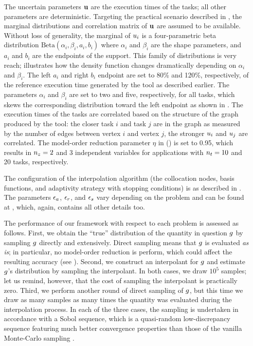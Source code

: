 
The uncertain parameters $\mathbf{u}$ are the execution times of the tasks; all other
parameters are deterministic. Targeting the practical scenario described in
, the marginal distributions and correlation matrix of $\mathbf{u}$
are assumed to be available. Without loss of generality, the marginal of $u_i$
is a four-parametric beta distribution $\text{Beta}(\alpha_i, \beta_i, a_i,
b_i)$ where $\alpha_i$ and $\beta_i$ are the shape parameters, and $a_i$ and
$b_i$ are the endpoints of the support. This family of distributions is very
reach;  illustrates how the density function changes
dramatically depending on $\alpha_i$ and $\beta_i$. The left $a_i$ and right
$b_i$ endpoint are set to 80\% and 120\%, respectively, of the reference
execution time generated by the  tool as described earlier. The
parameters $\alpha_i$ and $\beta_i$ are set to two and five, respectively, for
all tasks, which skews the corresponding distribution toward the left endpoint
as shown in . The execution times of the tasks are correlated
based on the structure of the graph produced by the  tool: the closer
task $i$ and task $j$ are in the graph as measured by the number of edges
between vertex $i$ and vertex $j$, the stronger $u_i$ and $u_j$ are
correlated. The model-order reduction parameter $\eta$ in 
() is set to 0.95, which results in ${n_z} = 2$ and 3 independent
variables for applications with ${n_t} = 10$ and 20 tasks, respectively.

The configuration of the interpolation algorithm (the collocation nodes, basis
functions, and adaptivity strategy with stopping conditions) is as described in
. The parameters $\epsilon_a$, $\epsilon_r$, and $\epsilon_s$ vary
depending on the problem and can be found at \cite{sources}, which, again,
contains all other details too.

The performance of our framework with respect to each problem is assessed as
follows. First, we obtain the ``true'' distribution of the quantity in question
$g$ by sampling $g$ directly and extensively. Direct sampling means that $g$
is evaluated \emph{as is}; in particular, no model-order reduction is perform,
which could affect the resulting accuracy (see ). Second, we
construct an interpolant for $g$ and estimate $g$'s distribution by sampling
the interpolant. In both cases, we draw $10^5$ samples; let us remind, however,
that the cost of sampling the interpolant is practically zero. Third, we perform
another round of direct sampling of $g$, but this time we draw as many samples
as many times the quantity was evaluated during the interpolation process. In
each of the three cases, the sampling is undertaken in accordance with a Sobol
sequence, which is a quasi-random low-discrepancy sequence featuring much better
convergence properties than those of the vanilla Monte-Carlo sampling
\cite{joe2008}.

